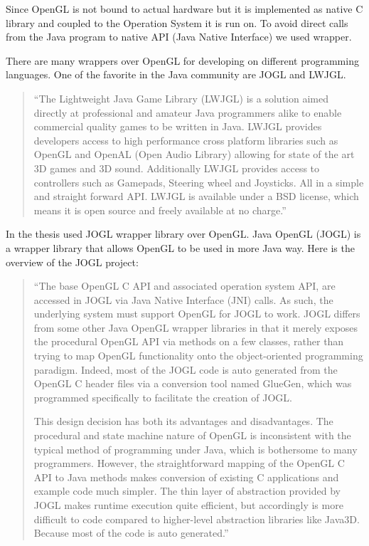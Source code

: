 Since OpenGL is not bound to actual hardware but it is implemented as native C library and coupled to the Operation System it is run on. To avoid direct calls from the Java program to native API (Java Native Interface) we used wrapper.

There are many wrappers over OpenGL for developing on different programming languages.
One of the favorite in the Java community are JOGL and LWJGL.

\begin{quotation}
``The Lightweight Java Game Library (LWJGL) is a solution aimed directly at professional and amateur Java programmers
alike to enable commercial quality games to be written in Java. LWJGL provides developers access to
high performance cross platform libraries such as OpenGL and OpenAL (Open Audio Library) allowing for state of the art
3D games and 3D sound. Additionally LWJGL provides access to controllers such as Gamepads, Steering wheel and Joysticks.
All in a simple and straight forward API.
LWJGL is available under a BSD license, which means it is open source and freely available at no charge.''~\cite{LWJGL}
\end{quotation}


In the thesis used JOGL wrapper library over OpenGL. Java OpenGL (JOGL) is a wrapper library that allows OpenGL to be used in more Java way. Here is the overview of the JOGL project:

\begin{quotation}
``The base OpenGL C API and associated operation system API, are accessed in JOGL via Java Native Interface (JNI) calls.
As such, the underlying system must support OpenGL for JOGL to work.
JOGL differs from some other Java OpenGL wrapper libraries in that it merely exposes the procedural OpenGL API
via methods on a few classes, rather than trying to map OpenGL functionality onto the object-oriented programming paradigm.
Indeed, most of the JOGL code is auto generated from the OpenGL C header files via a conversion tool named GlueGen,
which was programmed specifically to facilitate the creation of JOGL.

This design decision has both its advantages and disadvantages.
The procedural and state machine nature of OpenGL is inconsistent with the typical method of programming under Java,
which is bothersome to many programmers. However, the straightforward mapping of the OpenGL C API to Java methods
makes conversion of existing C applications and example code much simpler.
The thin layer of abstraction provided by JOGL makes runtime execution quite efficient,
but accordingly is more difficult to code compared to higher-level abstraction libraries like Java3D.
Because most of the code is auto generated.''~\cite{JOGL}
\end{quotation}


